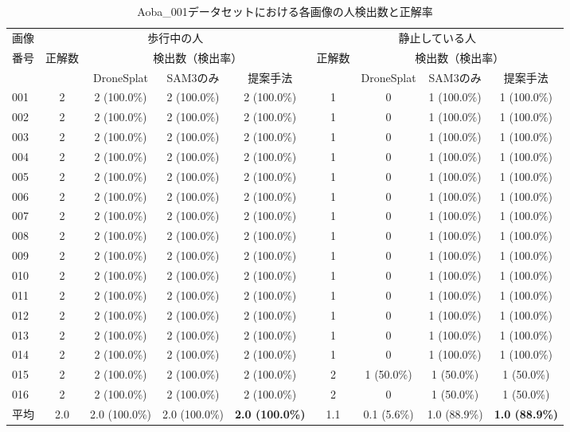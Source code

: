 \documentclass[a4paper,dvipdfmx,ja=standard,9pt]{bxjsarticle}
\begin{document}
\begin{table}[htbp]
  \centering
  \caption{Aoba\_001データセットにおける各画像の人検出数と正解率}
  \small
  \begin{tabular}{lcccccccc}
    \toprule
    画像 & \multicolumn{4}{c}{歩行中の人} & \multicolumn{4}{c}{静止している人} \\
    \cmidrule(lr){2-5} \cmidrule(lr){6-9}
    番号 & 正解数 & \multicolumn{3}{c}{検出数（検出率）} & 正解数 & \multicolumn{3}{c}{検出数（検出率）} \\
    \cmidrule(lr){3-5} \cmidrule(lr){7-9}
     & & DroneSplat & SAM3のみ & 提案手法 & & DroneSplat & SAM3のみ & 提案手法 \\
    \midrule
    001 & 2 & 2 (100.0\%) & 2 (100.0\%) & 2 (100.0\%) & 1 & 0 & 1 (100.0\%) & 1 (100.0\%) \\
    002 & 2 & 2 (100.0\%) & 2 (100.0\%) & 2 (100.0\%) & 1 & 0 & 1 (100.0\%) & 1 (100.0\%) \\
    003 & 2 & 2 (100.0\%) & 2 (100.0\%) & 2 (100.0\%) & 1 & 0 & 1 (100.0\%) & 1 (100.0\%) \\
    004 & 2 & 2 (100.0\%) & 2 (100.0\%) & 2 (100.0\%) & 1 & 0 & 1 (100.0\%) & 1 (100.0\%) \\
    005 & 2 & 2 (100.0\%) & 2 (100.0\%) & 2 (100.0\%) & 1 & 0 & 1 (100.0\%) & 1 (100.0\%) \\
    006 & 2 & 2 (100.0\%) & 2 (100.0\%) & 2 (100.0\%) & 1 & 0 & 1 (100.0\%) & 1 (100.0\%) \\
    007 & 2 & 2 (100.0\%) & 2 (100.0\%) & 2 (100.0\%) & 1 & 0 & 1 (100.0\%) & 1 (100.0\%) \\
    008 & 2 & 2 (100.0\%) & 2 (100.0\%) & 2 (100.0\%) & 1 & 0 & 1 (100.0\%) & 1 (100.0\%) \\
    009 & 2 & 2 (100.0\%) & 2 (100.0\%) & 2 (100.0\%) & 1 & 0 & 1 (100.0\%) & 1 (100.0\%) \\
    010 & 2 & 2 (100.0\%) & 2 (100.0\%) & 2 (100.0\%) & 1 & 0 & 1 (100.0\%) & 1 (100.0\%) \\
    011 & 2 & 2 (100.0\%) & 2 (100.0\%) & 2 (100.0\%) & 1 & 0 & 1 (100.0\%) & 1 (100.0\%) \\
    012 & 2 & 2 (100.0\%) & 2 (100.0\%) & 2 (100.0\%) & 1 & 0 & 1 (100.0\%) & 1 (100.0\%) \\
    013 & 2 & 2 (100.0\%) & 2 (100.0\%) & 2 (100.0\%) & 1 & 0 & 1 (100.0\%) & 1 (100.0\%) \\
    014 & 2 & 2 (100.0\%) & 2 (100.0\%) & 2 (100.0\%) & 1 & 0 & 1 (100.0\%) & 1 (100.0\%) \\
    015 & 2 & 2 (100.0\%) & 2 (100.0\%) & 2 (100.0\%) & 2 & 1 (50.0\%) & 1 (50.0\%) & 1 (50.0\%) \\
    016 & 2 & 2 (100.0\%) & 2 (100.0\%) & 2 (100.0\%) & 2 & 0 & 1 (50.0\%) & 1 (50.0\%) \\
    \midrule
    平均 & 2.0 & 2.0 (100.0\%) & 2.0 (100.0\%) & \textbf{2.0 (100.0\%)} & 1.1 & 0.1 (5.6\%) & 1.0 (88.9\%) & \textbf{1.0 (88.9\%)} \\
    \bottomrule
  \end{tabular}
  \label{tab:detection_comparison_aoba}
\end{table}
\FloatBarrier
\end{document}
